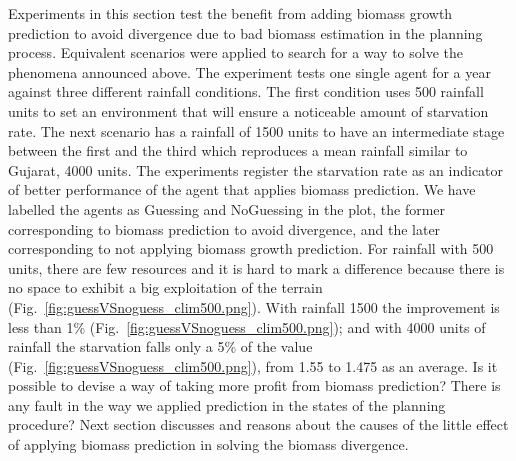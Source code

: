 \documentclass[11pt,oneside,a4paper,openright]{report}
\begin{document}

Experiments in this section test the benefit from adding biomass growth prediction to avoid divergence due 
to bad biomass estimation in the planning process. 
Equivalent scenarios were applied to search for a way to solve the phenomena announced above. 
The experiment tests one single agent for a year against three different rainfall conditions. The first
condition uses 500 rainfall units to set an environment that will ensure a noticeable amount of starvation 
rate. The next scenario has a rainfall of 1500 units to have an intermediate stage between the first and
the third which reproduces a mean rainfall similar to Gujarat, 4000 units.
The experiments register the starvation rate as an indicator of better performance of the agent that applies
biomass prediction. We have labelled the agents as Guessing and NoGuessing in the plot, the former 
corresponding to biomass prediction to avoid divergence, and the later corresponding to not applying biomass
growth prediction. For rainfall with 500 units, there are few resources and it is hard to mark a difference 
because there is no space to exhibit a big exploitation of the terrain 
(Fig.~\ref{fig:guessVSnoguess_clim500.png}). With rainfall 1500 the improvement is less than 1\% 
(Fig.~\ref{fig:guessVSnoguess_clim500.png}); and with 4000 units of rainfall the starvation falls only a 5\% 
of the value (Fig.~\ref{fig:guessVSnoguess_clim500.png}), from 1.55 to 1.475 as an average.
Is it possible to devise a way of taking more profit from biomass prediction? There is any fault in the way 
we applied prediction in the states of the planning procedure?
Next section discusses and reasons about the causes of the little effect of applying biomass prediction
in solving the biomass divergence. 
\end{document}
